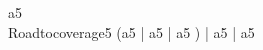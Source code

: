 
\begin{circus}
\circchannel a5 \\
\circprocess Roadtocoverage5 \circdef \circbegin
	\circspot
	  (a5 \then \Skip \lpar | \lchanset a5 \rchanset | \rpar a5 \then \Skip) \lpar | \lchanset a5 \rchanset | \rpar a5 \then \Skip \\
	\circend
\end{circus}
